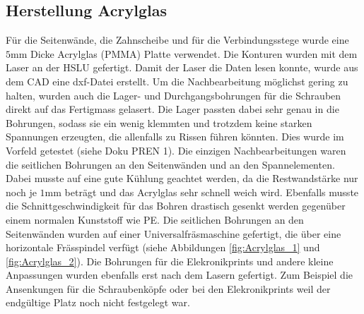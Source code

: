    \subsection{Herstellung Acrylglas}
		Für die Seitenwände, die Zahnscheibe und für die Verbindungsstege wurde eine 
		$5\si{\milli\meter}$ Dicke Acrylglas (PMMA) Platte verwendet. Die Konturen 
		wurden mit dem Laser an der HSLU gefertigt. Damit der Laser die Daten lesen 
		konnte, wurde aus dem CAD eine dxf-Datei erstellt. Um die Nachbearbeitung 
		möglichst gering zu halten, wurden auch die Lager- und Durchgangsbohrungen 
		für die Schrauben direkt auf das Fertigmass gelasert. Die Lager passten dabei 
		sehr genau in die Bohrungen, sodass sie ein wenig klemmten und trotzdem keine 
		starken Spannungen erzeugten, die allenfalls zu Rissen führen könnten. Dies 
		wurde im Vorfeld getestet (siehe Doku PREN 1). Die einzigen Nachbearbeitungen 
		waren die seitlichen Bohrungen an den Seitenwänden und an den Spannelementen. 
		Dabei musste auf eine gute Kühlung geachtet werden, da die Restwandstärke nur 
		noch je $1\si{\milli\meter}$ beträgt und das Acrylglas sehr schnell weich wird. 
		Ebenfalls musste die Schnittgeschwindigkeit für das Bohren drastisch gesenkt 
		werden gegenüber einem normalen Kunststoff wie PE. Die seitlichen Bohrungen an 
		den Seitenwänden wurden auf einer Universalfräsmaschine gefertigt, die über eine 
		horizontale Frässpindel verfügt (siehe Abbildungen \ref{fig:Acrylglas_1} und 
		\ref{fig:Acrylglas_2}). Die Bohrungen für die 
		Elekronikprints und andere kleine Anpassungen wurden ebenfalls erst nach dem 
		Lasern gefertigt. Zum Beispiel die Ansenkungen für die Schraubenköpfe oder bei 
		den Elekronikprints weil der endgültige Platz noch nicht festgelegt war.
